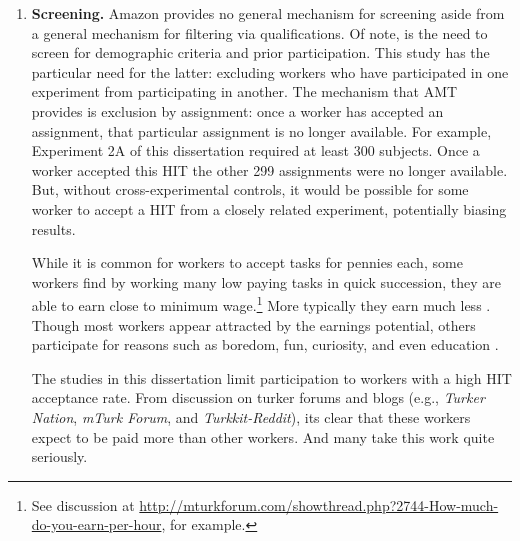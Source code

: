 \begin{enumerate}
\item \textbf{Screening.} Amazon provides no general mechanism for screening aside from a general mechanism for filtering via qualifications. Of note, is the need to screen for demographic criteria and prior participation. This study has the particular need for the latter: excluding workers who have participated in one experiment from participating in another.  The mechanism that AMT provides is exclusion by assignment:  once a worker has accepted an assignment, that particular assignment is no longer available. For example, Experiment 2A of this dissertation required at least 300 subjects. Once a worker accepted this HIT the other 299 assignments were no longer available. But, without cross-experimental controls, it would be possible for some worker to accept a HIT from a closely related experiment, potentially biasing results.
While it is common for workers to accept tasks for pennies each, some workers find by working many low paying tasks in quick succession, they are able to earn close to minimum wage.\footnote{See discussion at \url{http://mturkforum.com/showthread.php?2744-How-much-do-you-earn-per-hour}, for example.} More typically they earn much less \citep{Paolacci:2010ws}. Though most workers appear attracted by the earnings potential, others participate for reasons such as boredom, fun, curiosity, and even education \citep{Behrend:2011dx}.

The studies in this dissertation limit participation to workers with a high HIT acceptance rate. From discussion on turker forums and blogs (e.g., \textit{Turker Nation}, \textit{mTurk Forum}, and \textit{Turkkit-Reddit}), its clear that these workers expect to be paid more than other workers. And many take this work quite seriously. 


\end{enumerate}
